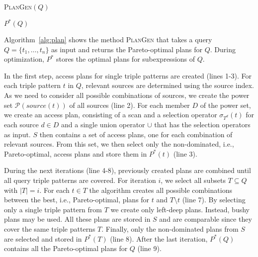 \begin{algorithm}
  \label{alg:plan}
  \DontPrintSemicolon

  \caption{\textsc{PlanGen}$(Q)$}


  \Return $P^*(Q)$
\end{algorithm}

Algorithm~\ref{alg:plan} shows the method \textsc{PlanGen} that takes
a query $Q=\{t_1,\ldots,t_n\}$ as input and
returns the Pareto-optimal plans for $Q$. During optimization, $P^*$
stores the optimal plans for subexpressions of $Q$.

In the first step, access plans for single triple patterns are created
(lines 1-3). For each triple pattern $t$ in $Q$, relevant
sources are determined using the source index. As we need to
consider all possible combinations of sources, we create the power set
$\mathcal{P}(source(t))$ of all sources (line 2). For each member $D$ of
the power set, we create an access plan, consisting of a scan and a selection operator $\sigma_{T^d}(t)$ for each source $d \in D$ and a
single union operator $\cup$ that has the selection operators as
input. $S$ then contains a set of access plans, one for each
combination of relevant sources. From this set, we then select only
the non-dominated, i.e., Pareto-optimal, access plans and store them
in $P^*(t)$ (line 3).

During the next iterations (line 4-8), previously
created plans are combined until all query triple patterns are
covered. For iteration $i$, we select all subsets $T \subseteq Q$ with
$|T|=i$. For each $t \in T$ the algorithm creates all possible combinations
between the best, i.e., Pareto-optimal, plans for $t$ and $T\setminus
t$ (line 7). By selecting only a single triple pattern from $T$ we
create only left-deep plans. Instead, bushy plans may be used.
All these plans are stored in $S$ and are comparable since they cover
the same triple patterns $T$. Finally, only the non-dominated plans
from $S$ are selected and stored in $P^*(T)$ (line 8). After the last
iteration, $P^*(Q)$ contains all the Pareto-optimal plans for
$Q$ (line 9).

